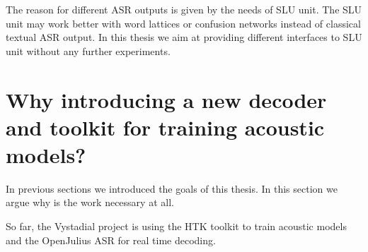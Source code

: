 The reason for different ASR outputs is given by the needs of SLU unit. The SLU unit may work better with word lattices or confusion networks instead of classical textual ASR output. In this thesis we aim at providing different interfaces to SLU unit without any further experiments.



    
\section{Why introducing a new decoder and toolkit for training acoustic models?} 
\label{sec:why}
In previous sections we introduced the goals of this thesis. In this section we argue why is the work necessary at all.





So far, the Vystadial project is using the HTK toolkit to train acoustic models and the OpenJulius ASR for real time decoding.
